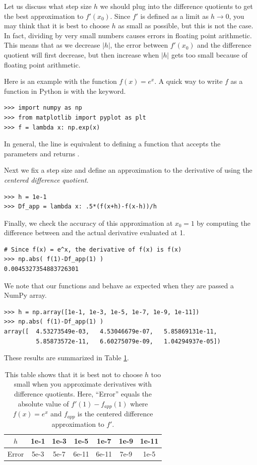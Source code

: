 Let us discuss what step size $h$ we should plug into the difference quotients to get the best approximation to $f'(x_0)$.
Since $f'$ is defined as a limit as $h \rightarrow 0$, you may think that it is best to choose $h$ as small as possible, but this is not the case.
In fact, dividing by very small numbers causes errors in floating point arithmetic.
This means that as we decrease $|h|$, the error between $f'(x_0)$ and the difference quotient will first decrease, but then increase when $|h|$ gets too small because of floating point arithmetic. 

Here is an example with the function $f(x) = e^x$. A quick way to write $f$ as a function in Python is with the  keyword. 
\begin{lstlisting}
>>> import numpy as np
>>> from matplotlib import pyplot as plt
>>> f = lambda x: np.exp(x)
\end{lstlisting}
In general, the line  is equivalent to defining a function  that accepts the parameters  and returns .

Next we fix a step size  and define an approximation to the derivative of  using the \emph{centered difference quotient}.
\begin{lstlisting}
>>> h = 1e-1
>>> Df_app = lambda x: .5*(f(x+h)-f(x-h))/h
\end{lstlisting}
Finally, we check the accuracy of this approximation at $x_0=1$ by computing the difference between  and the actual derivative evaluated at 1.
\begin{lstlisting}
# Since f(x) = e^x, the derivative of f(x) is f(x)
>>> np.abs( f(1)-Df_app(1) )
0.0045327354883726301
\end{lstlisting}
We note that our functions  and  behave as expected when they are passed a NumPy array.
\begin{lstlisting}
>>> h = np.array([1e-1, 1e-3, 1e-5, 1e-7, 1e-9, 1e-11])
>>> np.abs( f(1)-Df_app(1) )
array([  4.53273549e-03,   4.53046679e-07,   5.85869131e-11,
         5.85873572e-11,   6.60275079e-09,   1.04294937e-05])
\end{lstlisting}
These results are summarized in Table \ref{table:approx_errors}.

\begin{table}
\begin{center}
\begin{tabular}{|c|c|c|c|c|c|c|}
\hline
$h$ 		& 1e-1 & 1e-3 & 1e-5 & 1e-7	 & 1e-9 & 1e-11 \\ \hline
Error  	& 5e-3 & 5e-7 & 6e-11 & 6e-11 & 7e-9 & 1e-5\\ \hline
\end{tabular}
\caption{This table shows that it is best not to choose $h$ too small when you approximate derivatives with difference quotients. 
Here, ``Error'' equals the absolute value of $f'(1)-f_{app}(1)$ where $f(x) = e^x$ and $f_{app}$ is the centered difference approximation to $f'$.}
\label{table:approx_errors}
\end{center}
\end{table}

